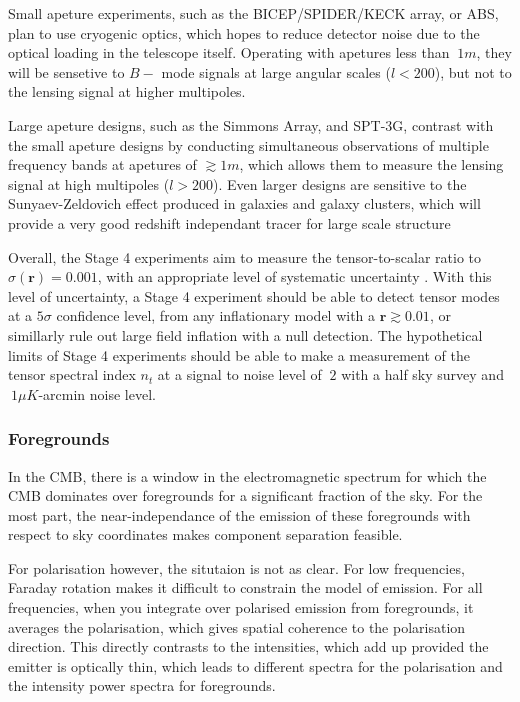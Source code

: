 {\par Small apeture experiments, such as the BICEP/SPIDER/KECK array, or ABS, plan to use cryogenic optics, which hopes to reduce detector noise due to the optical loading in the telescope itself. Operating with apetures less than $~ 1 m$, they will be sensetive to $B-$ mode signals at large angular scales ($l<200$), but not to the lensing signal at higher multipoles.

\par Large apeture designs, such as the Simmons Array, and SPT-3G, contrast with the small apeture designs by conducting simultaneous observations of multiple frequency bands at apetures of $\gtrsim 1 m $, which allows them to measure the lensing signal at high multipoles ($l>200$). Even larger designs are sensitive to the Sunyaev-Zeldovich effect produced in galaxies and galaxy clusters, which will provide a very good redshift independant tracer for large scale structure \cite{math/0208192}

\par Overall, the Stage 4 experiments aim to measure the tensor-to-scalar ratio to $\sigma(\textbf{r}) = 0.001$, with an appropriate level of systematic uncertainty \cite{1309.5381}. With this level of uncertainty, a Stage 4 experiment should be able to detect tensor modes at a $5\sigma$ confidence level, from any inflationary model with a $\textbf{r}\gtrsim 0.01$, or simillarly rule out large field inflation with a null detection. The hypothetical limits of Stage 4 experiments should be able to make a measurement of the tensor spectral index $n_t$ at a signal to noise level of $~2$ with a half sky survey and $~1 \mu K$-arcmin noise level.

\subsubsection{Foregrounds}
In the CMB, there is a window in the electromagnetic spectrum for which the CMB dominates over foregrounds for a significant fraction of the sky. For the most part, the near-independance of the emission of these foregrounds with respect to sky coordinates makes component separation feasible.

For polarisation however, the situtaion is not as clear. For low frequencies, Faraday rotation makes it difficult to constrain the model of emission. For all frequencies, when you integrate over polarised emission from foregrounds, it averages the polarisation, which gives spatial coherence to the polarisation direction. This directly contrasts to the intensities, which add up provided the emitter is optically thin, which leads to different spectra for the polarisation and the intensity power spectra for foregrounds.

}
